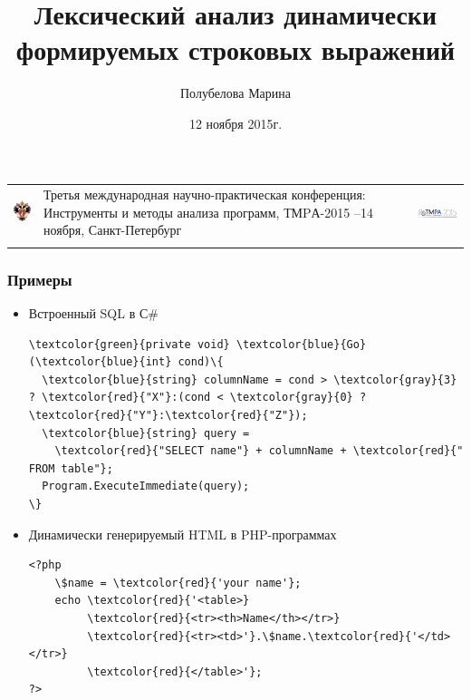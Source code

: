 \documentclass{beamer}
\title[]{Лексический анализ динамически формируемых строковых выражений}
\institute[СПбГУ]{
Санкт-Петербургский государственный университет}
\author[Полубелова Марина]{Полубелова Марина}
\date{12 ноября 2015г.}
\begin{document}
\begin{frame}
    \begin{tabular}[c c c]{m{2cm} m{5.5cm} m{3cm}}
        \begin{center}
        \includegraphics[width=1.3cm]{SPbGU_Logo.png}
    \end{center}
    &
    Третья международная научно-практическая конференция: \newline Инструменты и методы анализа программ, ТМPА-2015
    \newline
    12--14 ноября, Санкт-Петербург
    &
    \begin{center}
        \includegraphics[width=3cm]{tmpa2015_logo.png}
    \end{center}
    \\
    &&
    \end{tabular}
    \titlepage
\end{frame}


\begin{frame}[fragile]
\transwipe[direction=90]
\frametitle{Примеры}
\begin{itemize}

\item Встроенный SQL в С\#
\begin{Verbatim}[commandchars=\\\{\}]
\textcolor{green}{private void} \textcolor{blue}{Go} (\textcolor{blue}{int} cond)\{
  \textcolor{blue}{string} columnName = cond > \textcolor{gray}{3} ? \textcolor{red}{"X"}:(cond < \textcolor{gray}{0} ? \textcolor{red}{"Y"}:\textcolor{red}{"Z"});
  \textcolor{blue}{string} query = 
    \textcolor{red}{"SELECT name"} + columnName + \textcolor{red}{" FROM table"};
  Program.ExecuteImmediate(query);
\}
\end{Verbatim}
        
\item Динамически генерируемый HTML в PHP-программах
\begin{Verbatim}[commandchars=\\\{\}]   
<?php 
    \$name = \textcolor{red}{'your name'};
    echo \textcolor{red}{'<table>} 
         \textcolor{red}{<tr><th>Name</th></tr>}  
         \textcolor{red}{<tr><td>'}.\$name.\textcolor{red}{'</td></tr>} 
         \textcolor{red}{</table>'};
?>
\end{Verbatim}
\end{itemize}
\end{frame}
\end{document}
